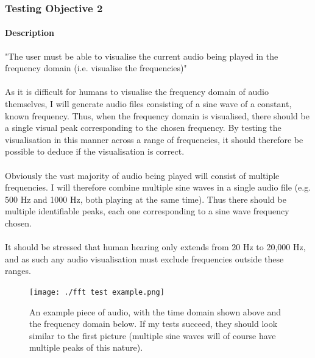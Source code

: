 \subsubsection{Testing Objective 2}
\paragraph{Description} "The user must be able to visualise the current audio being played in the frequency domain (i.e. visualise the frequencies)"

\paragraph{}
As it is difficult for humans to visualise the frequency domain of audio themselves, I will generate audio files consisting of a sine wave of a constant, known frequency. Thus, when the frequency domain is visualised, there should be a single visual peak corresponding to the chosen frequency. By testing the visualisation in this manner across a range of frequencies, it should therefore be possible to deduce if the visualisation is correct.

\paragraph{}
Obviously the vast majority of audio being played will consist of multiple frequencies. I will therefore combine multiple sine waves in a single audio file (e.g. 500 Hz and 1000 Hz, both playing at the same time). Thus there should be multiple identifiable peaks, each one corresponding to a sine wave frequency chosen.

\paragraph{}
It should be stressed that human hearing only extends from 20 Hz to 20,000 Hz, and as such any audio visualisation must exclude frequencies outside these ranges.

\begin{figure}[H]
	\texttt{[image: ./fft test example.png]}
	\caption{An example piece of audio, with the time domain shown above and the frequency domain below. If my tests succeed, they should look similar to the first picture (multiple sine waves will of course have multiple peaks of this nature). }
\end{figure}

